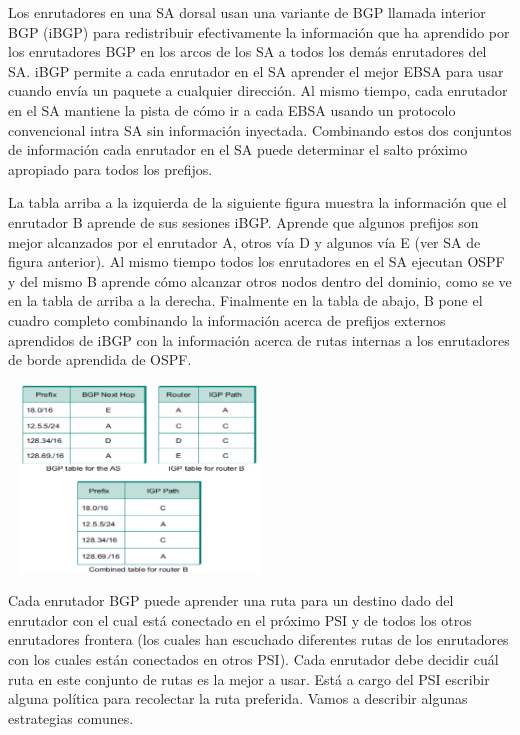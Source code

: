 \documentclass[10pt,a4paper]{report}
\begin{document}
	\par Los enrutadores en una SA dorsal usan una variante de BGP llamada interior BGP (iBGP) para redistribuir efectivamente la información que ha aprendido por los enrutadores BGP en los arcos de los SA a todos los demás enrutadores del SA. iBGP permite a cada enrutador en el SA aprender el mejor EBSA para usar cuando envía un paquete a cualquier dirección. Al mismo tiempo, cada enrutador en el SA mantiene la pista de cómo ir a cada EBSA usando un protocolo convencional intra SA sin información inyectada. Combinando estos dos conjuntos de información cada enrutador en el SA puede determinar el salto próximo apropiado para todos los prefijos.

	\par La tabla arriba a la izquierda de la siguiente figura muestra la información que el enrutador B aprende de sus sesiones iBGP. Aprende que algunos prefijos son mejor alcanzados por el enrutador A, otros vía D y algunos vía E (ver SA de figura anterior). Al mismo tiempo todos los enrutadores en el SA ejecutan OSPF y del mismo B aprende cómo alcanzar otros nodos dentro del dominio, como se ve en la tabla de arriba a la derecha. Finalmente en la tabla de abajo, B pone el cuadro completo combinando la información acerca de prefijos externos aprendidos de iBGP con la información acerca de rutas internas a los enrutadores de borde aprendida de OSPF.
	
	\begin{center}
		\includegraphics[width=7cm, height=5cm]{./imagenes/fig3.png}
	\end{center}

	\par Cada enrutador BGP puede aprender una ruta para un destino dado del enrutador con el cual está conectado en el próximo PSI y de todos los otros enrutadores frontera (los cuales han escuchado diferentes rutas de los enrutadores con los cuales están conectados en otros PSI). Cada enrutador debe decidir cuál ruta en este conjunto de rutas es la mejor a usar. Está a cargo del PSI escribir alguna política para recolectar la ruta preferida. Vamos a describir algunas estrategias comunes.
\end{document}
